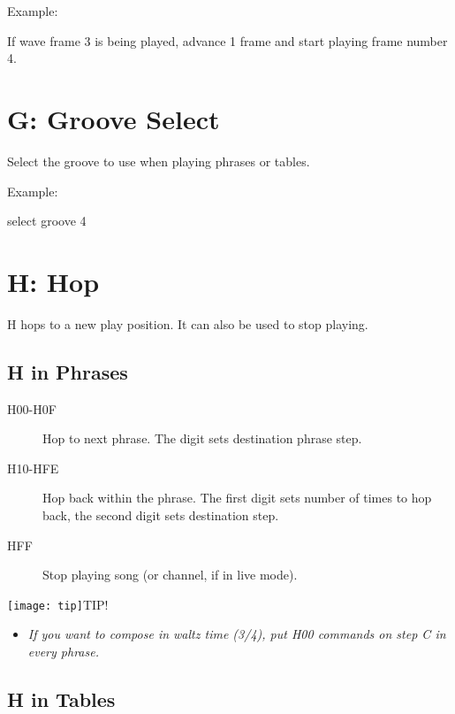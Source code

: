 \begin{description}
\item Example:
\item[F01] If wave frame 3 is being played, advance 1 frame and start playing frame number 4.
\end{description}

\section{G: Groove Select}

Select the groove to use when playing phrases or tables.

\begin{description}
\item Example:
\item[G04] select groove 4
\end{description}

\section{H: Hop}

H hops to a new play position. It can also be used to stop playing.

\subsection{H in Phrases}

\begin{description}
    \item[H00-H0F] Hop to next phrase. The digit sets destination phrase step.
    \item[H10-HFE] Hop back within the phrase. The first digit sets number of times to hop back, the second digit sets destination step.
    \item[HFF] Stop playing song (or channel, if in live mode).
\end{description}

\texttt{[image: tip]}TIP!
\nolinebreak
\begin{itemize}
        \item \textit{If you want to compose in waltz time (3/4), put \textsc{H00} commands on step \textsc{C} in every phrase.}
\end{itemize}


\subsection{H in Tables}

